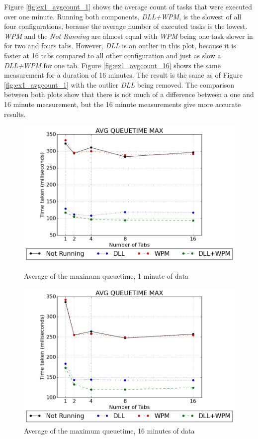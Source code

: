 Figure \ref{fig:ex1_avgcount_1} shows the average count of tasks that were executed over one minute. Running both components, \emph{\gls{DLL}+\gls{WPM}}, is the slowest of all four configurations, because the average number of executed tasks is the lowest. \emph{WPM} and the \emph{Not Running} are almost equal with \emph{\gls{WPM}} being one task slower in for two and fours tabs. However, \emph{\gls{DLL}} is an outlier in this plot, because it is faster at 16 tabs compared to all other configuration and just as slow a \emph{\gls{DLL}+\gls{WPM}} for one tab. Figure \ref{fig:ex1_avgcount_16} shows the same measurement for a duration of 16 minutes. The result is the same as of Figure \ref{fig:ex1_avgcount_1} with the outlier \emph{\gls{DLL}} being removed. The comparison between both plots show that there is not much of a difference between a one and 16 minute measurement, but the 16 minute measurements give more accurate results.
\begin{figure}[!htbp]
	\centering
    \includegraphics[width=\textwidth,height=0.45\textheight,keepaspectratio]{Evaluation/experiment1/AVG-QUEUETIME-MAX-1.png}
    \caption{Average of the maximum queuetime, 1 minute of data}
    \label{fig:ex1_avgqueuetimemax_1}

	\vspace*{\floatsep}

    \includegraphics[width=\textwidth,height=0.45\textheight,keepaspectratio]{Evaluation/experiment1/AVG-QUEUETIME-MAX-16.png}
    \caption{Average of the maximum queuetime, 16 minutes of data}
    \label{fig:ex1_avgqueuetimemax_16}
\end{figure}
